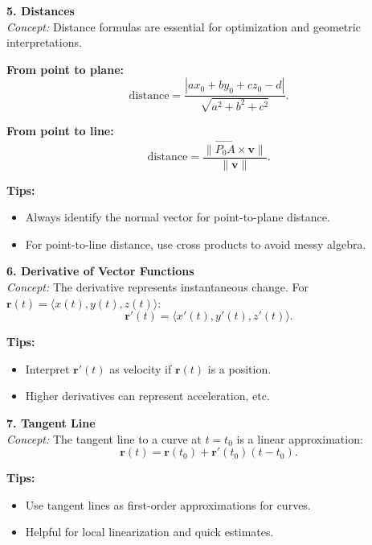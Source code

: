 \documentclass[9pt]{article}
\begin{document}
\begin{multicols}{2}
\begin{tcolorbox}[title=, colframe=brightblue]
\textbf{5. Distances}\\
\textit{Concept:} Distance formulas are essential for optimization and geometric interpretations.

\textbf{From point to plane:}
\[
\text{distance} = \frac{|ax_0+by_0+cz_0 - d|}{\sqrt{a^2 + b^2 + c^2}}.
\]

\textbf{From point to line:}
\[
\text{distance}=\frac{\|\overrightarrow{P_0A}\times \mathbf{v}\|}{\|\mathbf{v}\|}.
\]

\textbf{Tips:}
\begin{itemize}
    \item Always identify the normal vector for point-to-plane distance.
    \item For point-to-line distance, use cross products to avoid messy algebra.
\end{itemize}
\end{tcolorbox}

\begin{tcolorbox}[title=, colframe=brightgreen]
\textbf{6. Derivative of Vector Functions}\\
\textit{Concept:} The derivative represents instantaneous change. For $\mathbf{r}(t)=\langle x(t),y(t),z(t)\rangle$:
\[
\mathbf{r}'(t)=\langle x'(t),y'(t),z'(t)\rangle.
\]

\textbf{Tips:}
\begin{itemize}
    \item Interpret $\mathbf{r}'(t)$ as velocity if $\mathbf{r}(t)$ is a position.
    \item Higher derivatives can represent acceleration, etc.
\end{itemize}
\end{tcolorbox}

\begin{tcolorbox}[title=, colframe=brightpink]
\textbf{7. Tangent Line}\\
\textit{Concept:} The tangent line to a curve at $t=t_0$ is a linear approximation:
\[
\mathbf{r}(t)=\mathbf{r}(t_0)+\mathbf{r}'(t_0)(t-t_0).
\]

\textbf{Tips:}
\begin{itemize}
    \item Use tangent lines as first-order approximations for curves.
    \item Helpful for local linearization and quick estimates.
\end{itemize}
\end{tcolorbox}


\end{multicols}
\end{document}
